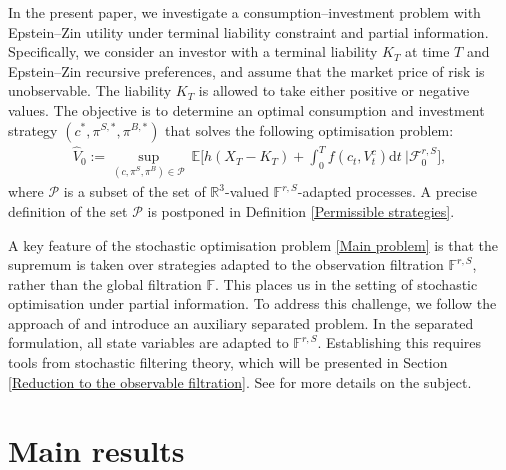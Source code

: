 \documentclass[12,reqno]{amsart}
\numberwithin{equation}{section}
\begin{document}
In the present paper, we investigate a consumption–investment problem with Epstein--Zin utility under terminal liability constraint and partial information. Specifically, we consider an investor with a terminal liability $K_{T}$ at time $T$ and Epstein--Zin recursive preferences, and assume that the market price of risk is unobservable. The liability $K_{T}$ is allowed to take either positive or negative values. The objective is to determine an optimal consumption and investment strategy $(c^{*},\pi^{S,*},\pi^{B,*})$ that solves the following optimisation problem:
\begin{align}\label{Main problem}
	\widehat{V}_{0}:=\sup_{(c,\pi^{S},\pi^{B})\in\mathcal{P}}~\mathbb{E}\Big[h(X_{T}-K_{T})+\int_{0}^{T}f(c_{t},V_{t}^{c})\mathrm{d}t~\big|\mathcal{F}_{0}^{r,S}\Big],
\end{align}
where $\mathcal{P}$ is a subset of the set of $\mathbb{R}^{3}$-valued $\mathbb{F}^{r,S}$-adapted processes. A precise definition of the set $\mathcal{P}$ is postponed in Definition \ref{Permissible strategies}.

A key feature of the stochastic optimisation problem \eqref{Main problem} is that the supremum is taken over strategies adapted to the observation filtration $\mathbb{F}^{r,S}$, rather than the global filtration $\mathbb{F}$. This places us in the setting of stochastic optimisation under partial information. To address this challenge, we follow the approach of \cite{fleming1982optimal} and introduce an auxiliary separated problem. In the separated formulation, all state variables are adapted to $\mathbb{F}^{r,S}$. Establishing this requires tools from stochastic filtering theory, which will be presented in Section \ref{Reduction to the observable filtration}. See \cite{liptser2013statisticsI} for more details on the subject.

\section{Main results}\label{Main results}
\end{document}
